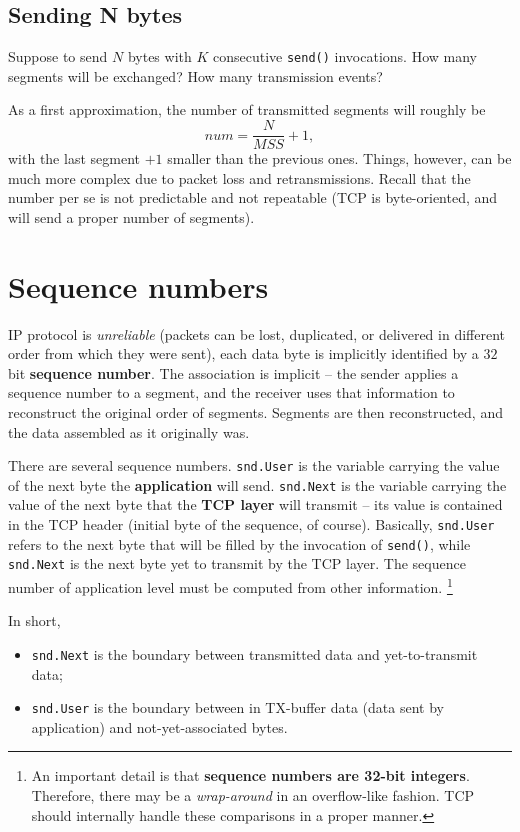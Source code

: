 \documentclass[a4paper, 11pt]{report}
\begin{document}
\subsection{Sending N bytes}

Suppose to send $N$ bytes with $K$ consecutive \texttt{send()} invocations. How
many segments will be exchanged? How many transmission events?

As a first approximation, the number of transmitted segments will roughly be
$$num = \frac{N}{MSS} + 1,$$ with the last segment $+1$ smaller than the
previous ones. Things, however, can be much more complex due to packet loss and
retransmissions. Recall that the number per se is not predictable and not
repeatable (TCP is byte-oriented, and will send a proper number of segments).

\section{Sequence numbers}

IP protocol is \emph{unreliable} (packets can be lost, duplicated, or delivered
in different order from which they were sent), each data byte is implicitly
identified by a $32$ bit \textbf{sequence number}. The association is implicit
\--- the sender applies a sequence number to a segment, and the receiver uses
that information to reconstruct the original order of segments. Segments are
then reconstructed, and the data assembled as it originally was.

There are several sequence numbers. \texttt{snd.User} is the variable carrying
the value of the next byte the \textbf{application} will send.
\texttt{snd.Next} is the variable carrying the value of the next byte that the
\textbf{TCP layer} will transmit \--- its value is contained in the TCP header
(initial byte of the sequence, of course). Basically, \texttt{snd.User} refers
to the next byte that will be filled by the invocation of \texttt{send()},
while \texttt{snd.Next} is the next byte yet to transmit by the TCP layer. The
sequence number of application level must be computed from other information.
\footnote{An important detail is that \textbf{sequence numbers are 32-bit integers}.
Therefore, there may be a \emph{wrap-around} in an overflow-like fashion. TCP
should internally handle these comparisons in a proper manner.}

In short,

\begin{itemize}
	\item \texttt{snd.Next} is the boundary between transmitted data and
		yet-to-transmit data;
	\item \texttt{snd.User} is the boundary between in TX-buffer data (data
		sent by application) and not-yet-associated bytes.
\end{itemize}
\end{document}
